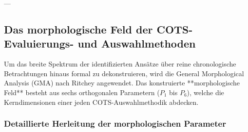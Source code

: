 ---

\subsection{Das morphologische Feld der COTS-Evaluierungs- und Auswahlmethoden}
\label{subsec:morphologisches_feld}

Um das breite Spektrum der identifizierten Ansätze über reine chronologische Betrachtungen hinaus formal zu dekonstruieren, wird die General Morphological Analysis (GMA) nach Ritchey angewendet. Das konstruierte **morphologische Feld** besteht aus sechs orthogonalen Parametern ($P_1$ bis $P_6$), welche die Kerndimensionen einer jeden COTS-Auswahlmethodik abdecken.

\subsubsection{Detaillierte Herleitung der morphologischen Parameter}

